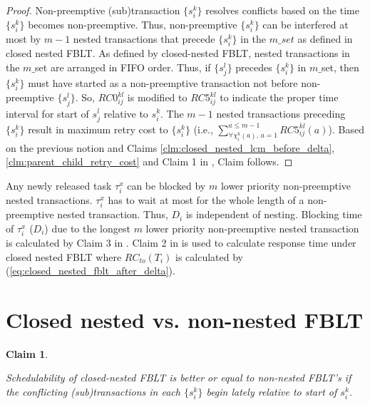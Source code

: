 \documentclass[10pt, conference, compsocconf]{IEEEtran}
\newtheorem{clm}{Claim}
\begin{document}
\begin{proof}

Non-preemptive (sub)transaction $\{s_{i}^{k}\}$ resolves conflicts
based on the time $\{s_{i}^{k}\}$ becomes non-preemptive. Thus, non-preemptive
$\{s_{i}^{k}\}$ can be interfered at most by $m-1$ nested transactions
that precede $\{s_{i}^{k}\}$ in the $m\_set$ as defined in closed
nested FBLT. As defined by closed-nested FBLT, nested transactions
in the $m\_$set are arranged in FIFO order. Thus, if $\{s_{j}^{l}\}$
precedes $\{s_{i}^{k}\}$ in $m\_$set, then $\{s_{i}^{k}\}$ must
have started as a non-preemptive transaction not before non-preemptive
$\{s_{j}^{l}\}$. So, $RC0_{ij}^{kl}$ is modified to $RC5_{ij}^{kl}$
to indicate the proper time interval for start of $s_{j}^{l}$ relative
to $s_{i}^{k}$. The $m-1$ nested transactions preceding $\{s_{i}^{k}\}$
result in maximum retry cost to $\{s_{i}^{k}\}$ (i.e., $\sum_{\forall\chi_{i}^{k}(a),\, a=1}^{a\le m-1}RC5_{ij}^{kl}(a)$).
Based on the previous notion and Claims \ref{clm:closed_nested_lcm_before_delta},
\ref{clm:parent_child_retry_cost} and Claim 1 in \cite{fblt}, Claim
follows.

\end{proof}

Any newly released task $\tau_{i}^{x}$ can be blocked by $m$ lower
priority non-preemptive nested transactions. $\tau_{i}^{x}$ has to
wait at most for the whole length of a non-preemptive nested transaction.
Thus, $D_{i}$ is independent of nesting. Blocking time of $\tau_{i}^{x}$
($D_{i}$) due to the longest $m$ lower priority non-preemptive nested
transaction is calculated by Claim 3 in \cite{fblt}. Claim 2 in \cite{fblt}
is used to calculate response time under closed nested FBLT where
$RC_{to}(T_{i})$ is calculated by (\ref{eq:closed_nested_fblt_after_delta}).


\section{Closed nested vs. non-nested FBLT}\label{sec:schedulabiltiy comparison}

\begin{clm}\label{clm:closed_nested_non_nested_fblt_schedulabiltiy_comp}

Schedulability of closed-nested FBLT is better or equal to non-nested
FBLT's if the conflicting (sub)transactions in each $\{s_{i}^{k}\}$
begin lately relative to start of $s_{i}^{k}$.

\end{clm}
\end{document}
